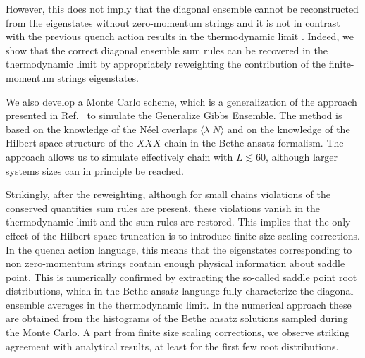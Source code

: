 \documentclass[11pt]{iopart}
\begin{document}
However, this does not imply that the diagonal ensemble cannot be reconstructed  
from the eigenstates without zero-momentum strings and it is not in contrast 
with the previous quench action results in the thermodynamic limit \cite{wouters-2014A,pozsgay-2014A}.
Indeed, we show  that the correct diagonal ensemble 
sum rules can be recovered in the thermodynamic limit by appropriately 
reweighting the contribution of the finite-momentum strings eigenstates.  

We also develop a Monte Carlo scheme, which is a generalization of 
the approach presented in Ref.~\cite{alba-2015} to simulate the Generalize 
Gibbs Ensemble. The method is based on the knowledge of the N\'eel overlaps 
$\langle\lambda|N\rangle$ and on the knowledge of the Hilbert space structure 
of the $XXX$ chain in the Bethe ansatz formalism. The approach allows us to 
simulate effectively chain with $L\lesssim 60$, although larger systems 
sizes can in principle be reached. 

Strikingly, after the reweighting, although for small chains violations of the conserved quantities 
sum rules are present, these violations vanish in the thermodynamic limit 
and the sum rules are restored. This implies that the only effect of the 
Hilbert space truncation is to introduce finite size scaling corrections. 
In the quench action language, this means that the eigenstates corresponding to non 
zero-momentum strings contain enough physical information about saddle point. 
This is numerically confirmed by extracting the so-called saddle point 
root distributions, which in the Bethe ansatz language fully characterize 
the diagonal ensemble averages in the thermodynamic limit. In the numerical  
 approach these are obtained from the histograms of the Bethe ansatz 
solutions sampled during the Monte Carlo. A part from finite size scaling 
corrections, we observe striking agreement with analytical results, at least 
for the first few root distributions. 






%
%
\end{document}
